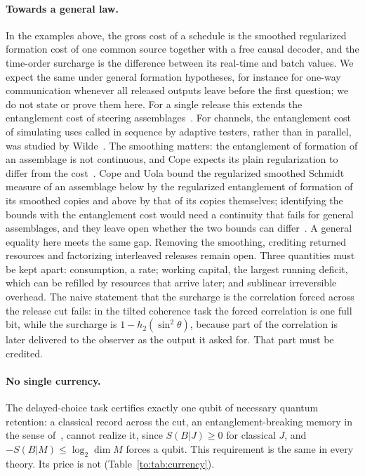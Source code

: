 \paragraph{Towards a general law.} In the examples above, the gross cost of a schedule is the smoothed regularized formation cost of one common source together with a free causal decoder, and the time-order surcharge is the difference between its real-time and batch values. We expect the same under general formation hypotheses, for instance for one-way communication whenever all released outputs leave before the first question; we do not state or prove them here. For a single release this extends the entanglement cost of steering assemblages~\cite{Cope21}. For channels, the entanglement cost of simulating uses called in sequence by adaptive testers, rather than in parallel, was studied by Wilde~\cite{Wilde18}. The smoothing matters: the entanglement of formation of an assemblage is not continuous, and Cope expects its plain regularization to differ from the cost~\cite{Cope21}. Cope and Uola bound the regularized smoothed Schmidt measure of an assemblage below by the regularized entanglement of formation of its smoothed copies and above by that of its copies themselves; identifying the bounds with the entanglement cost would need a continuity that fails for general assemblages, and they leave open whether the two bounds can differ~\cite[Sec.~VI.A, Eq.~(22)]{CopeUola22}. A general equality here meets the same gap. Removing the smoothing, crediting returned resources and factorizing interleaved releases remain open. Three quantities must be kept apart: consumption, a rate; working capital, the largest running deficit, which can be refilled by resources that arrive later; and sublinear irreversible overhead. The naive statement that the surcharge is the correlation forced across the release cut fails: in the tilted coherence task the forced correlation is one full bit, while the surcharge is $1-h_2(\sin^2\theta)$, because part of the correlation is later delivered to the observer as the output it asked for. That part must be credited.

\paragraph{No single currency.} The delayed-choice task certifies exactly one qubit of necessary quantum retention: a classical record across the cut, an entanglement-breaking memory in the sense of~\cite{RBL18}, cannot realize it, since $S(B|J)\ge0$ for classical $J$, and $-S(B|M)\le\log_2\dim M$ forces a qubit. This requirement is the same in every theory. Its price is not (Table~\ref{to:tab:currency}).

